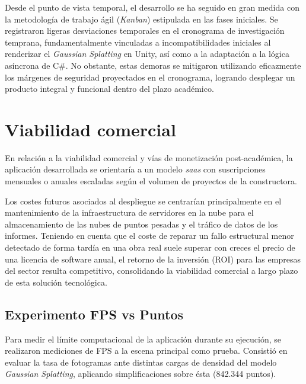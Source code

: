 Desde el punto de vista temporal, el desarrollo se ha seguido en gran medida con la metodología de trabajo ágil (\textit{Kanban}) estipulada en las fases iniciales. Se registraron ligeras desviaciones temporales en el cronograma de investigación temprana, fundamentalmente vinculadas a incompatibilidades iniciales al renderizar el \textit{Gaussian Splatting} en Unity, así como a la adaptación a la lógica asíncrona de C\#. No obstante, estas demoras se mitigaron utilizando eficazmente los márgenes de seguridad proyectados en el cronograma, logrando desplegar un producto integral y funcional dentro del plazo académico.

\section{Viabilidad comercial}

En relación a la viabilidad comercial y vías de monetización post-académica, la aplicación desarrollada se orientaría a un modelo \textit{\gls{saas}} con suscripciones mensuales o anuales escaladas según el volumen de proyectos de la constructora.  

Los costes futuros asociados al despliegue se centrarían principalmente en el mantenimiento de la infraestructura de servidores en la nube para el almacenamiento de las nubes de puntos pesadas y el tráfico de datos de los informes. Teniendo en cuenta que el coste de reparar un fallo estructural menor detectado de forma tardía en una obra real suele superar con creces el precio de una licencia de software anual, el retorno de la inversión (ROI) para las empresas del sector resulta competitivo, consolidando la viabilidad comercial a largo plazo de esta solución tecnológica.

















\subsection{Experimento FPS vs Puntos}

Para medir el límite computacional de la aplicación durante su ejecución, se realizaron mediciones de FPS a la escena principal como prueba. Consistió en evaluar la tasa de fotogramas ante distintas cargas de densidad del modelo \textit{Gaussian Splatting}, aplicando simplificaciones sobre ésta (842.344 puntos). 

